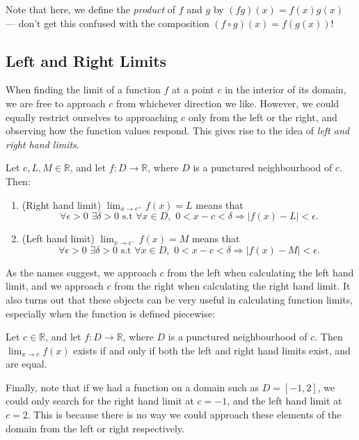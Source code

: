 \documentclass[
  12pt,
  a4paper]{extarticle}
\providecommand{\tightlist}{%
  \setlength{\itemsep}{0pt}\setlength{\parskip}{0pt}}
\theoremstyle{plain}
\theoremstyle{definition}
\theoremstyle{plain}
\theoremstyle{plain}
\theoremstyle{plain}
\theoremstyle{plain}
\theoremstyle{definition}
\theoremstyle{definition}
\theoremstyle{remark}
\theoremstyle{remark}
\let\BeginKnitrBlock\begin \let\EndKnitrBlock\end
\renewcommand{\;}{\,}
\begin{document}
Note that here, we define the \emph{product} of \(f\) and \(g\) by \((fg)(x) = f(x)g(x)\) --- don't get this confused with the composition \((f \circ g)(x) = f(g(x))\)!

\hypertarget{left-and-right-limits}{%
\subsection{Left and Right Limits}\label{left-and-right-limits}}

When finding the limit of a function \(f\) at a point \(c\) in the interior of its domain, we are free to approach \(c\) from whichever direction we like. However, we could equally restrict ourselves to approaching \(c\) only from the left or the right, and observing how the function values respond. This gives rise to the idea of \emph{left and right hand limits}.

\BeginKnitrBlock{definition}[Left and Right Hand Limits]
{\label{def:def1} }Let \(c, L, M \in \mathbb{R}\), and let \(f: D \to \mathbb{R}\), where \(D\) is a punctured neighbourhood of \(c\). Then:

\begin{enumerate}
\def\labelenumi{\arabic{enumi}.}
\tightlist
\item
  (Right hand limit) \(\lim_{x \to c^{+}}f(x) = L\) means that \[\forall \epsilon >0\;\;\exists \delta>0\;\;\text{s.t}\;\; \forall x \in D,\;\; 0 < x - c < \delta \Rightarrow \lvert f(x) - L \rvert < \epsilon.\]
\item
  (Left hand limit) \(\lim_{x \to c^{-}}f(x) = M\) means that \[\forall \epsilon >0\;\;\exists \delta>0\;\;\text{s.t}\;\; \forall x \in D,\;\; 0 < x - c < \delta \Rightarrow \lvert f(x) - M \rvert < \epsilon.\]
\end{enumerate}
\EndKnitrBlock{definition}

As the names suggest, we approach \(c\) from the left when calculating the left hand limit, and we approach \(c\) from the right when calculating the right hand limit. It also turns out that these objects can be very useful in calculating function limits, especially when the function is defined piecewise:

\BeginKnitrBlock{proposition}
{\label{prp:prop1} }Let \(c \in \mathbb{R}\), and let \(f: D \to \mathbb{R}\), where \(D\) is a punctured neighbourhood of \(c\). Then \(\lim_{x \to c}f(x)\) exists if and only if both the left and right hand limits exist, and are equal.
\EndKnitrBlock{proposition}

Finally, note that if we had a function on a domain such as \(D = [-1,2]\), we could only search for the right hand limit at \(c = -1\), and the left hand limit at \(c = 2\). This is because there is no way we could approach these elements of the domain from the left or right respectively.
\end{document}

